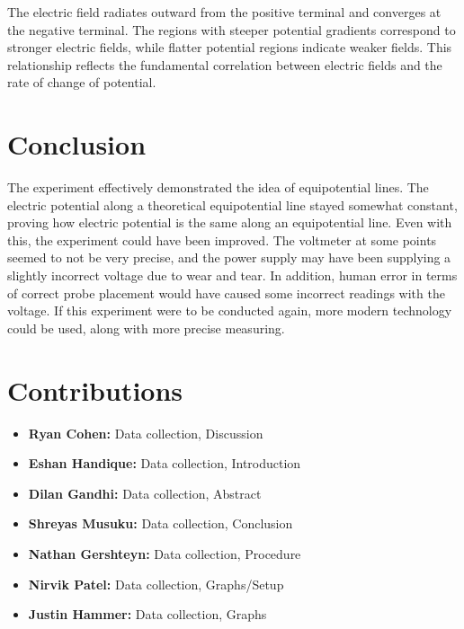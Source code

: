 \documentclass[conference]{IEEEtran}
\begin{document}
The electric field radiates outward from the positive terminal and converges at the negative terminal. The regions with steeper potential gradients correspond to stronger electric fields, while flatter potential regions indicate weaker fields. This relationship reflects the fundamental correlation between electric fields and the rate of change of potential.

\section{Conclusion}
The experiment effectively demonstrated the idea of equipotential lines. The electric potential along a theoretical equipotential line stayed somewhat constant, proving how electric potential is the same along an equipotential line. Even with this, the experiment could have been improved. The voltmeter at some points seemed to not be very precise, and the power supply may have been supplying a slightly incorrect voltage due to wear and tear. In addition, human error in terms of correct probe placement would have caused some incorrect readings with the voltage. If this experiment were to be conducted again, more modern technology could be used, along with more precise measuring.

        \vspace{90mm} 

\section*{Contributions}
\begin{itemize}
    \item \textbf{Ryan Cohen:} Data collection, Discussion
    \item \textbf{Eshan Handique:} Data collection, Introduction
    \item \textbf{Dilan Gandhi:} Data collection, Abstract
    \item \textbf{Shreyas Musuku:} Data collection, Conclusion
    \item \textbf{Nathan Gershteyn:} Data collection, Procedure
    \item \textbf{Nirvik Patel:} Data collection, Graphs/Setup
    \item \textbf{Justin Hammer:} Data collection, Graphs
\end{itemize}
\end{document}
